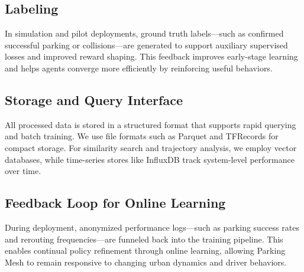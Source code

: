 \subsection{Labeling}
In simulation and pilot deployments, ground truth labels—such as confirmed successful parking or collisions—are generated to support auxiliary supervised losses and improved reward shaping. This feedback improves early-stage learning and helps agents converge more efficiently by reinforcing useful behaviors.

\subsection{Storage and Query Interface}
All processed data is stored in a structured format that supports rapid querying and batch training. We use file formats such as Parquet and TFRecords for compact storage. For similarity search and trajectory analysis, we employ vector databases, while time-series stores like InfluxDB track system-level performance over time.

\subsection{Feedback Loop for Online Learning}
During deployment, anonymized performance logs—such as parking success rates and rerouting frequencies—are funneled back into the training pipeline. This enables continual policy refinement through online learning, allowing Parking Mesh to remain responsive to changing urban dynamics and driver behaviors.
